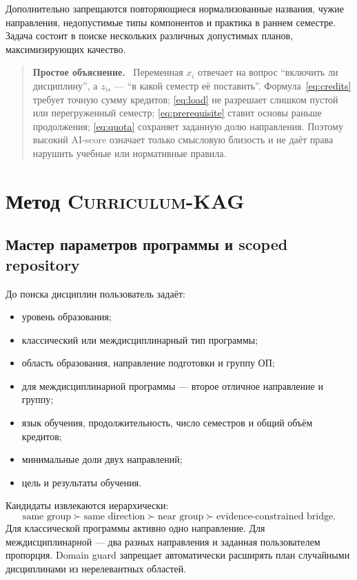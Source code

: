 \documentclass[twoside,11pt]{article}
\newcommand{\systemname}{\textsc{Curriculum-KAG}}
\newenvironment{plainbox}{%
  \begin{quote}\small\noindent\textbf{Простое объяснение.}\ }{%
  \end{quote}}
\begin{document}
Дополнительно запрещаются повторяющиеся нормализованные названия, чужие направления, недопустимые типы компонентов и практика в раннем семестре. Задача состоит в поиске нескольких различных допустимых планов, максимизирующих качество.

\begin{plainbox}
Переменная $x_i$ отвечает на вопрос ``включить ли дисциплину'', а $z_{is}$ ---
``в какой семестр её поставить''. Формула~\eqref{eq:credits} требует точную сумму
кредитов; \eqref{eq:load} не разрешает слишком пустой или перегруженный семестр;
\eqref{eq:prerequisite} ставит основы раньше продолжения; \eqref{eq:quota}
сохраняет заданную долю направления. Поэтому высокий AI-score означает только
смысловую близость и не даёт права нарушить учебные или нормативные правила.
\end{plainbox}

\section{Метод \systemname{}}

\subsection{Мастер параметров программы и scoped repository}

До поиска дисциплин пользователь задаёт:
\begin{itemize}
  \item уровень образования;
  \item классический или междисциплинарный тип программы;
  \item область образования, направление подготовки и группу ОП;
  \item для междисциплинарной программы --- второе отличное направление и группу;
  \item язык обучения, продолжительность, число семестров и общий объём кредитов;
  \item минимальные доли двух направлений;
  \item цель и результаты обучения.
\end{itemize}

Кандидаты извлекаются иерархически:
\begin{equation}
  \text{same group}
  \succ
  \text{same direction}
  \succ
  \text{near group}
  \succ
  \text{evidence-constrained bridge}.
  \label{eq:scope}
\end{equation}
Для классической программы активно одно направление. Для междисциплинарной --- два разных направления и заданная пользователем пропорция. Domain guard запрещает автоматически расширять план случайными дисциплинами из нерелевантных областей.
\end{document}
